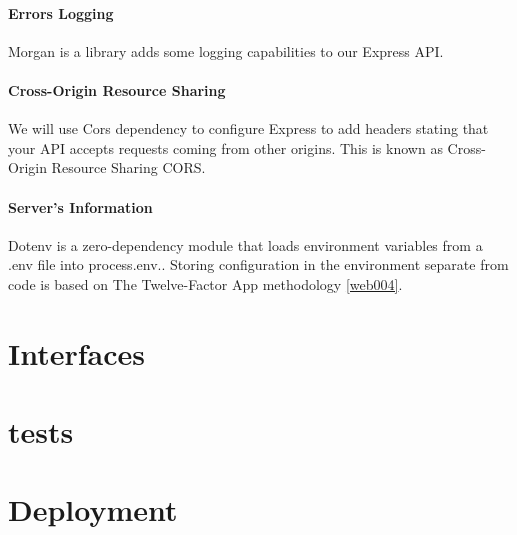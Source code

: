 \paragraph*{Errors Logging}
Morgan is a library adds some logging capabilities to our Express API.

\paragraph*{Cross-Origin Resource Sharing}
We will use Cors dependency to configure Express to add headers stating that your API accepts requests coming from other origins. This is known as Cross-Origin Resource Sharing \ac{CORS}.
\paragraph*{Server's Information}
Dotenv is a zero-dependency module that loads environment variables from a .env file into process.env.. Storing configuration in the environment separate from code is based on The Twelve-Factor App methodology \ref{web004}.



\section{Interfaces}

\section{tests}



\section{Deployment}

